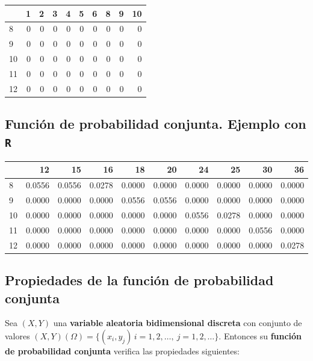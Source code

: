 \documentclass[]{book}
\begin{document}
\begin{tabular}{l|r|r|r|r|r|r|r|r|r}
\hline
  & 1 & 2 & 3 & 4 & 5 & 6 & 8 & 9 & 10\\
\hline
8 & 0 & 0 & 0 & 0 & 0 & 0 & 0 & 0 & 0\\
\hline
9 & 0 & 0 & 0 & 0 & 0 & 0 & 0 & 0 & 0\\
\hline
10 & 0 & 0 & 0 & 0 & 0 & 0 & 0 & 0 & 0\\
\hline
11 & 0 & 0 & 0 & 0 & 0 & 0 & 0 & 0 & 0\\
\hline
12 & 0 & 0 & 0 & 0 & 0 & 0 & 0 & 0 & 0\\
\hline
\end{tabular}

\hypertarget{funciuxf3n-de-probabilidad-conjunta.-ejemplo-con-r-7}{%
\subsection{\texorpdfstring{Función de probabilidad conjunta. Ejemplo con \texttt{R}}{Función de probabilidad conjunta. Ejemplo con R}}\label{funciuxf3n-de-probabilidad-conjunta.-ejemplo-con-r-7}}

\begin{tabular}{l|r|r|r|r|r|r|r|r|r}
\hline
  & 12 & 15 & 16 & 18 & 20 & 24 & 25 & 30 & 36\\
\hline
8 & 0.0556 & 0.0556 & 0.0278 & 0.0000 & 0.0000 & 0.0000 & 0.0000 & 0.0000 & 0.0000\\
\hline
9 & 0.0000 & 0.0000 & 0.0000 & 0.0556 & 0.0556 & 0.0000 & 0.0000 & 0.0000 & 0.0000\\
\hline
10 & 0.0000 & 0.0000 & 0.0000 & 0.0000 & 0.0000 & 0.0556 & 0.0278 & 0.0000 & 0.0000\\
\hline
11 & 0.0000 & 0.0000 & 0.0000 & 0.0000 & 0.0000 & 0.0000 & 0.0000 & 0.0556 & 0.0000\\
\hline
12 & 0.0000 & 0.0000 & 0.0000 & 0.0000 & 0.0000 & 0.0000 & 0.0000 & 0.0000 & 0.0278\\
\hline
\end{tabular}

\hypertarget{propiedades-de-la-funciuxf3n-de-probabilidad-conjunta}{%
\subsection{Propiedades de la función de probabilidad conjunta}\label{propiedades-de-la-funciuxf3n-de-probabilidad-conjunta}}

Sea \((X,Y)\) una \textbf{variable aleatoria bidimensional discreta} con conjunto de valores \((X,Y)(\Omega)=\{(x_i,y_j)\, i=1,2,\ldots,\ j=1,2,\ldots\}\). Entonces su \textbf{función de probabilidad conjunta} verifica las propiedades siguientes:
\end{document}
